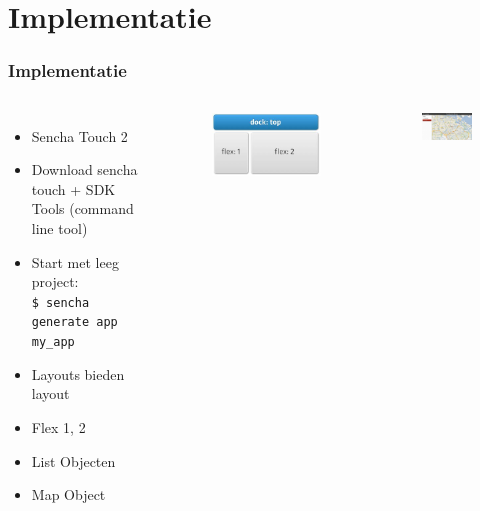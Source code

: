 \documentclass[10pt,a4paper]{beamer}
\begin{document}
\section{Implementatie}
\begin{frame}
\frametitle{Implementatie}
\begin{columns}
\column{6cm}
\begin{itemize}
\item Sencha Touch 2
\item Download sencha touch + SDK Tools (command line tool)
\item Start met leeg project: \\ \texttt{\$ sencha generate app my\_app}
\item Layouts bieden layout
\item Flex 1, 2
\item List Objecten
\item Map Object
\end{itemize}
\column{4cm}
\begin{figure}
\includegraphics[scale=0.3]{docktop.png}
\end{figure}
\begin{figure}
\includegraphics[width=4cm]{ui/fsb_layout.png}
\end{figure}
\end{columns}
\end{frame}
\end{document}
